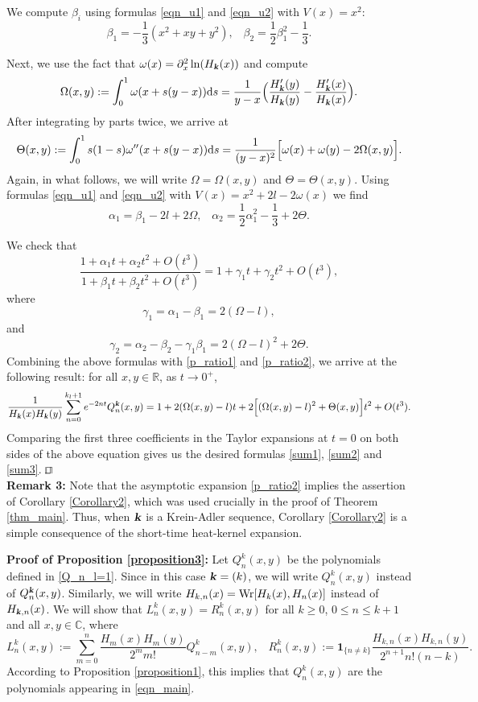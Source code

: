 \documentclass[12pt]{article}
\def\qed{\hfill$\sqcap\kern-8.0pt\hbox{$\sqcup$}$\\}
\def\r{{\mathbb R}}
\def\wr{\textnormal{Wr}}
\def\c{{\mathbb C}}
\def\d{{\textnormal d}}
\def\k{\textbf{\textsl{k}}}
\begin{document}
We compute $\beta_i$ using formulas \eqref{eqn_u1} and \eqref{eqn_u2} with $V(x)=x^2$: 
\[
\beta_1=-\frac{1}{3} (x^2+xy+y^2), \;\;\; \beta_2=\frac{1}{2} \beta_1^2 - \frac{1}{3}. 
\]

Next, we use the fact that $\omega(x)=\partial_x^2 \ln(H_{\k}(x))$ and compute 
\begin{equation*}
\Omega(x,y):=\int_0^1 \omega(x+s(y-x)) \d s=\frac{1}{y-x} \Big( \frac{H'_{\k}(y)}{H_{\k}(y)}
- \frac{H'_{\k}(x)}{H_{\k}(x)} \Big). 
\end{equation*}
After integrating by parts twice, we arrive at
\begin{equation*}
\Theta(x,y):=\int_0^1 
s(1-s)\omega''(x+s(y-x)) \d s=
\frac{1}{(y-x)^2} \Big[\omega(x)+\omega(y)-2\Omega(x,y)\Big].
\end{equation*}
Again, in what follows, we will write $\Omega=\Omega(x,y)$ and $\Theta=\Theta(x,y)$. 
Using formulas \eqref{eqn_u1} and \eqref{eqn_u2} with $V(x)=x^2+2l-2\omega(x)$ we find  
\[
\alpha_1=\beta_1-2l+2 \Omega, \;\;\;
\alpha_2=\frac{1}{2} \alpha_1^2 - \frac{1}{3} + 2 \Theta. 
\]


We check that 
\[
\frac{1+\alpha_1 t+\alpha_2 t^2+O(t^3)}{1+\beta_1 t + \beta_2 t^2 + O(t^3)}=
1+\gamma_1 t + \gamma_2 t^2 + O(t^3),
\]
where 
\[
\gamma_1=\alpha_1-\beta_1=2 (\Omega-l),
\]
and 
\[
\gamma_2=\alpha_2-\beta_2-\gamma_1 \beta_1 = 2 (\Omega-l)^2 + 2\Theta.
\]
Combining the above formulas with \eqref{p_ratio1} and \eqref{p_ratio2}, we arrive at the following result: for all $x,y\in\r$, as $t\to 0^+$,
\[
\frac{1}{H_{\k}(x) H_{\k}(y)}
\sum\limits_{n=0}^{k_l+1} e^{-2nt} Q_n^{\k}(x,y)=1+2 (\Omega(x,y)-l) t + 2 \Big[ (\Omega(x,y)-l)^2 + \Theta(x,y)\Big] t^2 + O(t^3).
\]
Comparing the first three coefficients in the Taylor expansions at $t=0$ on both sides of the above equation gives us the desired formulas  \eqref{sum1}, \eqref{sum2} and \eqref{sum3}. 
\qed

\vspace{0.2cm}
\noindent
{\bf Remark 3:} Note that the asymptotic expansion \eqref{p_ratio2} implies the assertion of Corollary \ref{Corollary2}, which was used crucially in the proof of Theorem \ref{thm_main}. Thus, when $\k$ is a Krein-Adler sequence, Corollary \ref{Corollary2} is a simple consequence of the short-time heat-kernel expansion.
\vspace{0.2cm}


\noindent
{\bf Proof of Proposition \ref{proposition3}:}
Let $Q_n^k(x,y)$ be the polynomials defined in \eqref{Q_n_l=1}. Since in this case $\k=(k)$, we will write $Q_n^k(x,y)$ instead of $Q_n^{\k}(x,y)$. Similarly, we will write $H_{k,n}(x)=\wr[H_k(x),H_n(x)]$ instead of $H_{\k,n}(x)$.  
We will show that $L_n^k(x,y)=R_n^k(x,y)$ for all $k\geqslant 0$, $0\leqslant n \leqslant k+1$ and all $x,y\in \c$, where 
\[
L_n^k(x,y):=\sum_{m=0}^{n}
\frac{H_m(x)H_m(y)}{2^m m!}
Q_{n-m}^k(x,y), \;\;\;
R_n^k(x,y):=
\mathbf 1_{\{n\ne k\}}
\frac{H_{k,n}(x)H_{k,n}(y)}
{2^{n+1}n!(n-k)}.
\]
According to Proposition \ref{proposition1}, this implies that $Q_n^k(x,y)$ are the polynomials appearing in \eqref{eqn_main}. 
\end{document}
